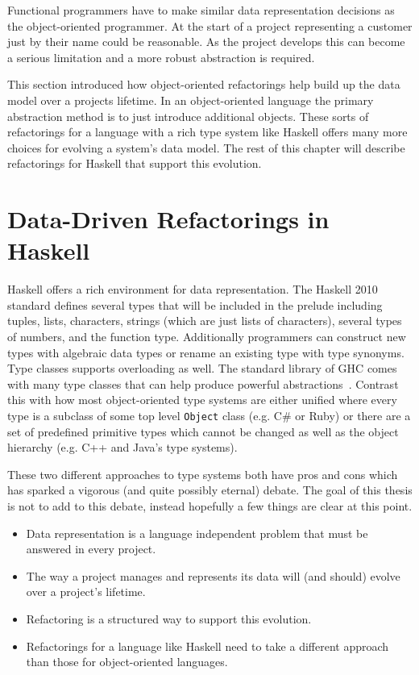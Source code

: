 Functional programmers have to make similar data representation decisions as the object-oriented programmer. At the start of a project representing a customer just by their name could be reasonable. As the project develops this can become a serious limitation and a more robust abstraction is required.

This section introduced how object-oriented refactorings help build up the data model over a projects lifetime. In an object-oriented language the primary abstraction method is to just introduce additional objects. These sorts of refactorings for a language with a rich type system like  Haskell offers many more choices for evolving a system's data model. The rest of this chapter will describe refactorings for Haskell that support this evolution.  

\section{Data-Driven Refactorings in Haskell}

Haskell offers a rich environment for data representation. The Haskell 2010 standard defines several types that will be included in the prelude including tuples, lists, characters, strings (which are just lists of characters), several types of numbers, and the function type. Additionally programmers can construct new types with algebraic data types or rename an existing type with type synonyms. Type classes supports overloading as well. The standard library of GHC comes with many type classes that can help produce powerful abstractions~\citep{typeclassopedia}. Contrast this with how most object-oriented type systems are either unified where every type is a subclass of some top level \texttt{Object} class (e.g. C\# or Ruby) or there are a set of predefined primitive types which cannot be changed as well as the object hierarchy (e.g. C++ and Java's type systems). 

These two different approaches to type systems both have pros and cons which has sparked a vigorous (and quite possibly eternal) debate. The goal of this thesis is not to add to this debate, instead hopefully a few things are clear at this point.

\begin{itemize}
	\item Data representation is a language independent problem that must be answered in every project.
	\item The way a project manages and represents its data will (and should) evolve over a project's lifetime.
	\item Refactoring is a structured way to support this evolution.
	\item Refactorings for a language like Haskell need to take a different approach than those for object-oriented languages.
\end{itemize} 

